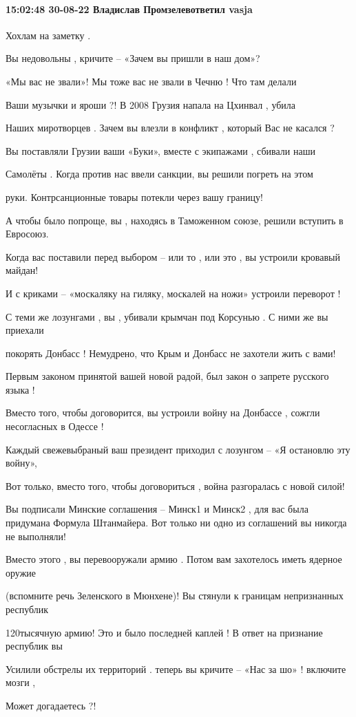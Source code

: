 
 
 
 
 

\paragraph{15:02:48 30-08-22 Владислав Промзелевответил vasja}

 Хохлам на заметку .

Вы недовольны , кричите – «Зачем вы пришли в наш дом»?

«Мы вас не звали»! Мы тоже вас не звали в Чечню ! Что там делали

Ваши музычки и яроши ?! В 2008 Грузия напала на Цхинвал , убила 

Наших миротворцев . Зачем вы влезли в конфликт , который Вас не касался ? 

Вы поставляли Грузии ваши «Буки», вместе с экипажами , сбивали наши 

Самолёты . Когда против нас ввели санкции, вы решили погреть на этом 

руки. Контрсанционные товары потекли через вашу границу!

А чтобы было попроще, вы , находясь в Таможенном союзе, решили вступить в Евросоюз. 

Когда вас поставили перед выбором – или то , или это , вы устроили кровавый майдан! 

И с криками – «москаляку на гиляку, москалей на ножи» устроили переворот ! 

С теми же лозунгами , вы , убивали крымчан под Корсунью . С ними же вы приехали

покорять Донбасс ! Немудрено, что Крым и Донбасс не захотели жить с вами!

Первым законом принятой вашей новой радой, был закон о запрете русского языка ! 

Вместо того, чтобы договорится, вы устроили войну на Донбассе , сожгли несогласных в Одессе !

Каждый свежевыбраный ваш президент приходил с лозунгом – «Я остановлю эту войну», 

Вот только, вместо того, чтобы договориться , война разгоралась с новой силой! 

Вы подписали Минские соглашения – Минск1 и Минск2 , для вас была придумана Формула Штанмайера. Вот только ни одно из соглашений вы никогда не выполняли!

Вместо этого , вы перевооружали армию . Потом вам захотелось иметь ядерное оружие 

(вспомните речь Зеленского в Мюнхене)! Вы стянули к границам непризнанных республик 

120тысячную армию! Это и было последней каплей ! В ответ на признание республик вы 

Усилили обстрелы их территорий . теперь вы кричите – «Нас за шо» ! включите мозги , 

Может догадаетесь ?! 
